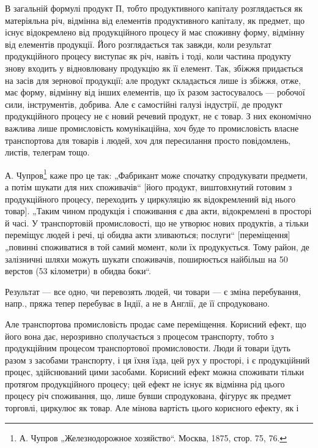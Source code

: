 В загальній формулі продукт П, тобто продуктивного капіталу розглядається
як матеріяльна річ, відмінна від елементів продуктивного капіталу, як
предмет, що існує відокремлено від продукційного процесу й має споживну
форму, відмінну від елементів продукції. Його розглядається так завжди, коли
результат продукційного процесу виступає як річ, навіть і тоді, коли частина
продукту знову входить у відновлювану продукцію як її елемент. Так,
збіжжя придається на засів для зернової продукції; але продукт складається
лише із збіжжя, отже, має форму, відмінну від інших елементів, що
їх разом застосувалось — робочої сили, інструментів, добрива. Але є
самостійні галузі індустрії, де продукт продукційного процесу не є
новий речевий продукт, не є товар. З них економічно важлива лише
промисловість комунікаційна, хоч буде то промисловість власне транспортова
для товарів і людей, хоч для пересилання просто повідомлень,
листів, телеграм тощо.

А. Чупров\footnote{
А. Чупров „Железнодорожное хозяйство“. Москва, 1875, стор. 75, 76.
} каже про це так: „Фабрикант може спочатку спродукувати
предмети, а потім шукати для них споживачів“ [його продукт, виштовхнутий
готовим з продукційного процесу, переходить у циркуляцію як
відокремлений від нього товар]. „Таким чином продукція і споживання є
два акти, відокремлені в просторі й часі. У транспортовій промисловості,
що не утворює нових продуктів, а тільки переміщує людей і речі, ці
обидва акти зливаються; послуги“ [переміщення] „повинні споживатися в
той самий момент, коли їх продукується. Тому район, де залізничні шляхи
можуть шукати споживачів, поширюється найбільш на 50 верстов
(53 кілометри) в обидва боки“.

Результат — все одно, чи перевозять людей, чи товари — є зміна перебування,
напр., пряжа тепер перебуває в Індії, а не в Англії, де її спродуковано.

Але транспортова промисловість продає саме переміщення. Корисний
ефект, що його вона дає, нерозривно сполучається з процесом транспорту,
тобто з продукційним процесом транспортової промисловости.
Люди й товари їдуть разом з засобами транспорту, і ця їхня їзда, цей
рух у просторі, і є продукційний процес, здійснюваний цими засобами. Корисний
ефект можна споживати тільки протягом продукційного процесу;
цей ефект не існує як відмінна рід цього процесу річ споживання,
що, лише бувши спродукована, фігурує як предмет торговлі,
циркулює як товар. Але мінова вартість цього корисного ефекту, як і
\parbreak{}  %
